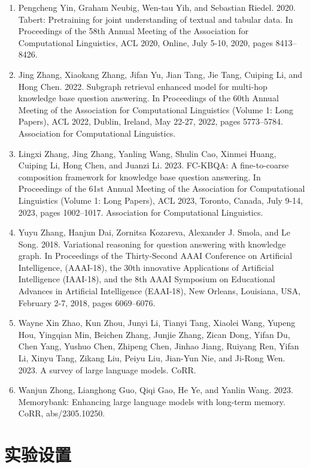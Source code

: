\documentclass[11pt,UTF8,fontset=fandol]{ctexart}
\begin{document}
\begin{enumerate}[leftmargin=2em]
\item Pengcheng Yin, Graham Neubig, Wen-tau Yih, and Sebastian Riedel. 2020. Tabert: Pretraining for joint understanding of textual and tabular data. In Proceedings of the 58th Annual Meeting of the Association for Computational Linguistics, ACL 2020, Online, July 5-10, 2020, pages 8413--8426.
\item Jing Zhang, Xiaokang Zhang, Jifan Yu, Jian Tang, Jie Tang, Cuiping Li, and Hong Chen. 2022. Subgraph retrieval enhanced model for multi-hop knowledge base question answering. In Proceedings of the 60th Annual Meeting of the Association for Computational Linguistics (Volume 1: Long Papers), ACL 2022, Dublin, Ireland, May 22-27, 2022, pages 5773--5784. Association for Computational Linguistics.
\item Lingxi Zhang, Jing Zhang, Yanling Wang, Shulin Cao, Xinmei Huang, Cuiping Li, Hong Chen, and Juanzi Li. 2023. FC-KBQA: A fine-to-coarse composition framework for knowledge base question answering. In Proceedings of the 61st Annual Meeting of the Association for Computational Linguistics (Volume 1: Long Papers), ACL 2023, Toronto, Canada, July 9-14, 2023, pages 1002--1017. Association for Computational Linguistics.
\item Yuyu Zhang, Hanjun Dai, Zornitsa Kozareva, Alexander J. Smola, and Le Song. 2018. Variational reasoning for question answering with knowledge graph. In Proceedings of the Thirty-Second AAAI Conference on Artificial Intelligence, (AAAI-18), the 30th innovative Applications of Artificial Intelligence (IAAI-18), and the 8th AAAI Symposium on Educational Advances in Artificial Intelligence (EAAI-18), New Orleans, Louisiana, USA, February 2-7, 2018, pages 6069--6076.
\item Wayne Xin Zhao, Kun Zhou, Junyi Li, Tianyi Tang, Xiaolei Wang, Yupeng Hou, Yingqian Min, Beichen Zhang, Junjie Zhang, Zican Dong, Yifan Du, Chen Yang, Yushuo Chen, Zhipeng Chen, Jinhao Jiang, Ruiyang Ren, Yifan Li, Xinyu Tang, Zikang Liu, Peiyu Liu, Jian-Yun Nie, and Ji-Rong Wen. 2023. A survey of large language models. CoRR.
\item Wanjun Zhong, Lianghong Guo, Qiqi Gao, He Ye, and Yanlin Wang. 2023. Memorybank: Enhancing large language models with long-term memory. CoRR, abs/2305.10250.
\end{enumerate}

\appendix
\section{实验设置}
\end{document}
